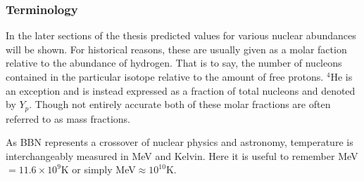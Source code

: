\subsubsection{Terminology}

In the later sections of the thesis predicted values for various nuclear abundances will be shown. For historical reasons, these are usually given as a molar faction relative to the abundance of hydrogen. That is to say, the number of nucleons contained in the particular isotope relative to the amount of free protons. ${}^4$He is an exception and is instead expressed as a fraction of total nucleons and denoted by $Y_p$. Though not entirely accurate both of these molar fractions are often referred to as mass fractions. 

As BBN represents a crossover of nuclear physics and astronomy, temperature is interchangeably measured in MeV and Kelvin. Here it is useful to remember MeV$=11.6\times10^9 $K or simply MeV$\approx 10^{10}$K.


